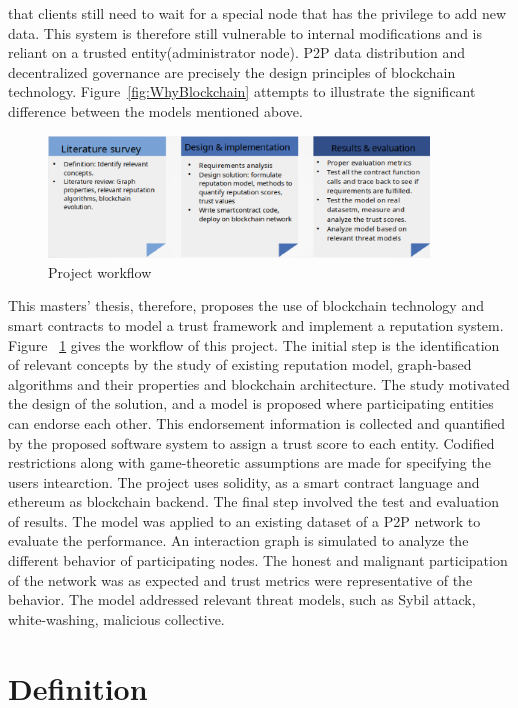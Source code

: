 that clients still need to wait for a special node that has the privilege to
add new data. This system is therefore still vulnerable to internal
modifications and is reliant on a trusted entity(administrator node). P2P data
distribution and decentralized governance are precisely the design principles
of blockchain technology. Figure~\ref{fig:WhyBlockchain} attempts to
illustrate the significant difference between the models mentioned above.\\
\begin{figure}
	\begin{center}
		\includegraphics[width=0.9\textwidth]{Images/ThesisSteps.eps}
		\caption{Project workflow}
		\label{fig:thesisSteps}
	\end{center}
\end{figure}
This masters' thesis, therefore, proposes the use of blockchain technology and
smart contracts to model a trust framework and implement a reputation system.
Figure ~\ref{fig:thesisSteps} gives the workflow of this project. The initial
step is the identification of relevant concepts by the study of existing
reputation model, graph-based algorithms and their properties and blockchain
architecture. The study motivated the design of the solution, and a model is
proposed where participating entities can endorse each other. This endorsement
information is collected and quantified by the proposed software system to
assign a trust score to each entity. Codified restrictions along with
game-theoretic assumptions are made for specifying the users intearction. The
project uses solidity, as a smart contract language and ethereum as blockchain
backend. The final step involved the test and evaluation of results. The model
was applied to an existing dataset of a P2P network to evaluate the
performance. An interaction graph is simulated to analyze the different
behavior of participating nodes. The honest and malignant participation of the
network was as expected and trust metrics were representative of the behavior.
The model addressed relevant threat models, such as Sybil attack,
white-washing, malicious collective. 

\section{Definition}
